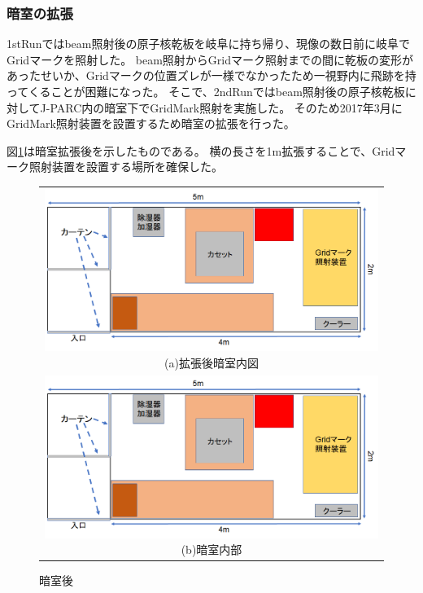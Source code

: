 \documentclass[12pt,a4paper]{jarticle}
\begin{document}
\subsubsection{暗室の拡張}
1stRunではbeam照射後の原子核乾板を岐阜に持ち帰り、現像の数日前に岐阜でGridマークを照射した。
beam照射からGridマーク照射までの間に乾板の変形があったせいか、Gridマークの位置ズレが一様でなかったため一視野内に飛跡を持ってくることが困難になった。
そこで、2ndRunではbeam照射後の原子核乾板に対してJ-PARC内の暗室下でGridMark照射を実施した。
そのため2017年3月にGridMark照射装置を設置するため暗室の拡張を行った。
\par
図\ref{fig:darkroom}は暗室拡張後を示したものである。
横の長さを1m拡張することで、Gridマーク照射装置を設置する場所を確保した。
\begin{figure}[htbp]
  \centering
    \begin{tabular}{c}
      \begin{minipage}{1.0\hsize}
        \centering
          \includegraphics[clip, width=140mm]{darkroom_after.png}
          \hspace{1.6cm} (a)拡張後暗室内図
      \end{minipage}
      \\
      \begin{minipage}{1.0\hsize}
        \centering
          \includegraphics[clip, width=140mm]{darkroom_after.png}
          \hspace{1.6cm} (b)暗室内部
      \end{minipage}
    \end{tabular}
    \caption{暗室後\label{fig:darkroom}}
\end{figure}
\end{document}
